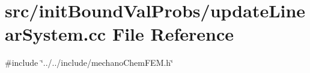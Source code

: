 \section{src/init\+Bound\+Val\+Probs/update\+Linear\+System.cc File Reference}
\label{update_linear_system_8cc}
{\ttfamily \#include \char`\"{}../../include/mechano\+Chem\+F\+E\+M.\+h\char`\"{}}\newline
